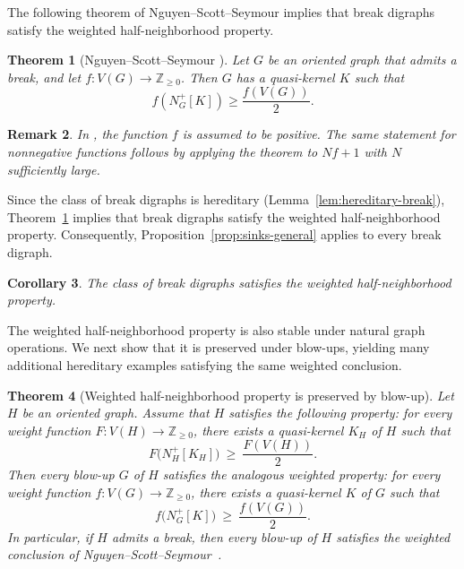 \documentclass[11pt,a4paper]{article}
\newtheorem{theorem}{Theorem}[section]
\newtheorem{corollary}[theorem]{Corollary}
\newtheorem{remark}[theorem]{Remark}
\begin{document}
The following theorem of Nguyen--Scott--Seymour implies that break digraphs
satisfy the weighted half-neighborhood property.

\begin{theorem}[Nguyen--Scott--Seymour {\cite[Theorem 3.2]{NSS}}]\label{thm:NSS}
Let \(G\) be an oriented graph that admits a break, and let
\(f:V(G)\to\mathbb Z_{\ge0}\).
Then \(G\) has a quasi-kernel \(K\) such that
\[
    f(N_G^+[K])\ge \frac{f(V(G))}{2}.
\]
\end{theorem}

\begin{remark}
In \cite[Theorem 3.2]{NSS}, the function \(f\) is assumed to be positive.
The same statement for nonnegative functions follows by applying the theorem
to \(Nf+1\) with \(N\) sufficiently large.
\end{remark}

Since the class of break digraphs is hereditary
(Lemma~\ref{lem:hereditary-break}),
Theorem~\ref{thm:NSS} implies that break digraphs satisfy the weighted
half-neighborhood property. Consequently,
Proposition~\ref{prop:sinks-general} applies to every break digraph.
\begin{corollary}
The class of break digraphs satisfies the weighted half-neighborhood property.
\end{corollary}

The weighted half-neighborhood property is also stable under natural graph operations. We next show that it is preserved under blow-ups, yielding many additional hereditary examples satisfying the same weighted conclusion.

\begin{theorem}[Weighted half-neighborhood property is preserved by blow-up]\label{thm:blowup}
Let $H$ be an oriented graph. Assume that $H$ satisfies the following property:
for every weight function $F:V(H)\to \mathbb{Z}_{\ge0}$, there exists a quasi-kernel $K_H$ of $H$ such that
\[
F\big(N_H^{+}[K_H]\big)\ \ge\ \frac{F(V(H))}{2}.
\]
Then every blow-up $G$ of $H$ satisfies the analogous weighted property:
for every weight function $f:V(G)\to \mathbb{Z}_{\ge0}$, there exists a quasi-kernel $K$ of $G$ such that
\[
f\big(N_G^{+}[K]\big)\ \ge\ \frac{f(V(G))}{2}.
\]
In particular, if $H$ admits a break, then every blow-up of $H$ satisfies the weighted
conclusion of Nguyen--Scott--Seymour~\cite[Theorem~3.2]{NSS}.
\end{theorem}
\end{document}
